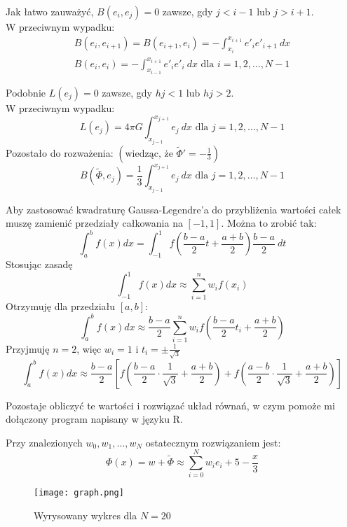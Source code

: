 \documentclass{article}
\begin{document}
\noindent
Jak łatwo zauważyć, \(B(e_i, e_j) = 0\) zawsze, gdy \(j < i-1 \text{ lub } j > i+1\).\\
W przeciwnym wypadku:
\begin{gather*}
    B(e_i, e_{i+1}) = B(e_{i+1}, e_i) = -\int_{x_i}^{x_{i+1}} e'_i e'_{i+1}\ dx\\
    B(e_i, e_i) = -\int_{x_{i-1}}^{x_{i+1}} e'_i e'_i\ dx \text{ dla } i=1,2,\ldots,N-1
\end{gather*}

\noindent
Podobnie \(L(e_j) = 0\) zawsze, gdy \(hj < 1 \text{ lub } hj > 2\).\\
W przeciwnym wypadku:
\[L(e_j) = 4 \pi G \int_{x_{j-1}}^{x_{j+1}} e_j\ dx \text{ dla } j=1,2,\ldots,N-1\]
Pozostało do rozważenia: \(\left(\text{wiedząc, że } \tilde{\Phi}' = -\frac{1}{3}\right)\)
\[B(\tilde{\Phi}, e_j) = \frac{1}{3} \int_{x_{j-1}}^{x_{j+1}} e_j\ dx \text{ dla } j=1,2,\ldots,N-1\]

Aby zastosować kwadraturę Gaussa-Legendre'a do przybliżenia wartości całek muszę zamienić przedziały całkowania na \([-1,1]\). Można to zrobić tak:
\[\int_a^b f(x)dx = \int_{-1}^1 f\left(\frac{b-a}{2} t + \frac{a+b}{2}\right)\frac{b-a}{2}\ dt\]
Stosując zasadę
\[\int_{-1}^1 f(x)dx \approx \sum_{i=1}^n w_i f(x_i)\]
Otrzymuję dla przedziału \([a,b]\):
\[\int_a^b f(x)dx \approx \frac{b-a}{2} \sum_{i=1}^n w_i f\left(\frac{b-a}{2} t_i + \frac{a + b}{2}\right)\]
Przyjmuję \(n=2\), więc \(w_i = 1 \text{ i } t_i = \pm \frac{1}{\sqrt{3}}\)
\[\int_a^b f(x)dx \approx \frac{b-a}{2} \left[f\left(\frac{b-a}{2} \cdot \frac{1}{\sqrt{3}} + \frac{a+b}{2}\right) + f\left(\frac{a-b}{2} \cdot \frac{1}{\sqrt{3}} + \frac{a+b}{2}\right)\right]\]

\vspace{5mm}
\noindent
Pozostaje obliczyć te wartości i rozwiązać układ równań, w czym pomoże mi dołączony program napisany w języku R.

\vspace{5mm}
\noindent
Przy znalezionych \(w_0, w_1, \ldots, w_N\) ostatecznym rozwiązaniem jest:
\[\Phi(x) = w + \tilde{\Phi} \approx \sum_{i=0}^N w_i e_i + 5 - \frac{x}{3}\]

\begin{figure}[h]
    \centering
    \texttt{[image: graph.png]}
    \caption{Wyrysowany wykres dla \(N=20\)}
    \label{fig:enter-label}
\end{figure}
\end{document}
